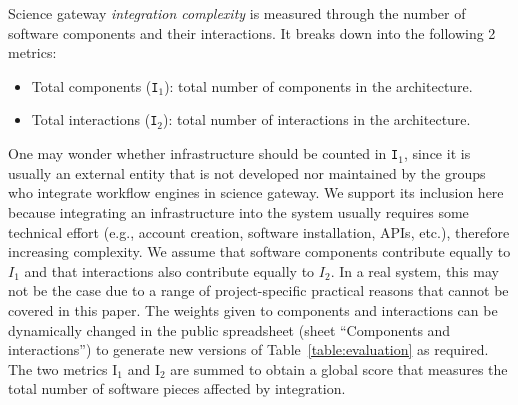 \documentclass[preprint,3p,twocolumn]{elsarticle}
\newcommand{\correction}[1]{\color{blue}#1\color{black}\xspace}
\begin{document}
Science gateway \emph{integration complexity} is measured through the number of software components and their interactions. It breaks
down into the following 2 metrics:
\begin{itemize}[leftmargin=0cm,itemindent=0.35cm,itemsep=0cm]
\item Total components (\texttt{I$_1$}): total number of components in
  the architecture.
\item Total interactions (\texttt{I$_2$}): total number of
  interactions in the architecture.
\end{itemize}
One may wonder whether infrastructure should be counted in
\texttt{I$_1$}, since it is usually an external entity that is not
developed nor maintained by the groups who integrate workflow engines
in science gateway. We support its inclusion here because integrating
an infrastructure into the system usually requires some technical
effort (e.g., account creation, software installation, APIs, etc.),
therefore increasing complexity. \correction{We assume that software
  components contribute equally to $I_1$ and that interactions also
  contribute equally to $I_2$. In a real system, this may not be the
  case due to a range of project-specific practical reasons that
  cannot be covered in this paper. The weights given to components and
  interactions can be dynamically changed in the public spreadsheet
  (sheet ``Components and interactions'') to generate new versions of
  Table~\ref{table:evaluation} as required.} The two metrics
\correction{I$_1$ and I$_2$} are summed to obtain a global score that
measures the total number of software pieces affected by integration.
\end{document}
